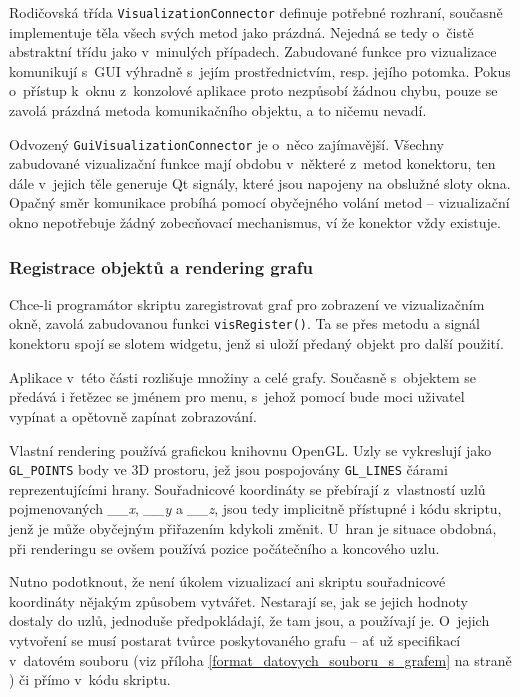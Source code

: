 \documentclass[11pt,twoside,a4paper]{book}
\begin{document}
Rodičovská třída \texttt{VisualizationConnector} definuje potřebné rozhraní, současně implementuje těla všech svých metod jako prázdná. Nejedná se tedy o~čistě abstraktní třídu jako v~minulých případech. Zabudované funkce pro vizualizace komunikují s~GUI výhradně s~jejím prostřednictvím, resp. jejího potomka. Pokus o~přístup k~oknu z~konzolové aplikace proto nezpůsobí žádnou chybu, pouze se zavolá prázdná metoda komunikačního objektu, a to ničemu nevadí.

Odvozený \texttt{GuiVisualizationConnector} je o~něco zajímavější. Všechny zabudované vizualizační funkce mají obdobu v~některé z~metod konektoru, ten dále v~jejich těle generuje Qt signály, které jsou napojeny na obslužné sloty okna. Opačný směr komunikace probíhá pomocí obyčejného volání metod -- vizualizační okno nepotřebuje žádný zobecňovací mechanismus, ví že konektor vždy existuje.


\subsubsection{Registrace objektů a rendering grafu}

Chce-li programátor skriptu zaregistrovat graf pro zobrazení ve vizualizačním okně, zavolá zabudovanou funkci \texttt{visRegister()}. Ta se přes metodu a signál konektoru spojí se slotem widgetu, jenž si uloží předaný objekt pro další použití.

Aplikace v~této části rozlišuje množiny a celé grafy. Současně s~objektem se předává i řetězec se jménem pro menu, s~jehož pomocí bude moci uživatel vypínat a opětovně zapínat zobrazování.

Vlastní rendering používá grafickou knihovnu OpenGL. Uzly se vykreslují jako \texttt{GL\_POINTS} body ve 3D prostoru, jež jsou pospojovány \texttt{GL\_LINES} čárami reprezentujícími hrany. Sou\-řad\-ni\-co\-vé koordináty se přebírají z~vlastností uzlů pojmenovaných \textit{\_\_x}, \textit{\_\_y} a \textit{\_\_z}, jsou tedy implicitně přístupné i kódu skriptu, jenž je může obyčejným přiřazením kdykoli změnit. U~hran je situace obdobná, při renderingu se ovšem používá pozice počátečního a koncového uzlu.

Nutno podotknout, že není úkolem vizualizací ani skriptu souřadnicové koordináty nějakým způsobem vytvářet. Nestarají se, jak se jejich hodnoty dostaly do uzlů, jednoduše před\-po\-klá\-da\-jí, že tam jsou, a používají je. O~jejich vytvoření se musí postarat tvůrce poskytovaného grafu -- ať už specifikací v~datovém souboru (viz příloha \ref{format_datovych_souboru_s_grafem} na straně \pageref{format_datovych_souboru_s_grafem}) či přímo v~kódu skriptu.
\end{document}
